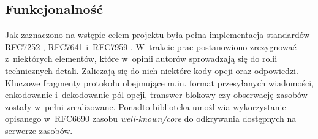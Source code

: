 \subsection{Funkcjonalność}

Jak zaznaczono na wstępie celem projektu była pełna implementacja standardów RFC7252 \cite{rfc_coap}, RFC7641 \cite{rfc_observer} i~RFC7959 \cite{rfc_block}. W~trakcie prac postanowiono zrezygnować z~niektórych elementów, które w~opinii autorów sprowadzają się do rolii technicznych detali. Zaliczają się do nich niektóre kody opcji oraz odpowiedzi. Kluczowe fragmenty protokołu obejmujące m.in. format przesyłanych wiadomości, enkodowanie i~dekodowanie pól opcji, transwer blokowy czy obserwację zasobów zostały w~pełni zrealizowane. Ponadto biblioteka umożliwia wykorzystanie opisanego w~RFC6690 \cite{core_link} zasobu \textit{well-known/core} do odkrywania dostępnych na serwerze zasobów.

